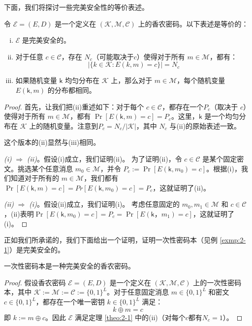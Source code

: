 下面，我们将探讨一些完美安全性的等价表述。

\begin{theorem}\label{theo:2-1}
令 $\mathcal{E}=(E,D)$ 是一个定义在 $(\mathcal{K},\mathcal{M},\mathcal{C})$ 上的香农密码。以下表述是等价的：
\begin{enumerate}[(i)]
	\item $\mathcal{E}$ 是完美安全的。
	\item 对于任意 $c\in\mathcal{C}$，存在 $N_c$（可能取决于$c$）使得对于所有 $m\in\mathcal{M}$，都有：
	$$
    |\{k\in\mathcal{K}:E(k,m)=c\}| = N_c
    $$
    \item 如果随机变量 $\mathsf{k}$ 均匀分布在 $\mathcal{K}$ 上，那么对于 $m\in\mathcal{M}$，每个随机变量 $E(\mathsf{k},m)$ 的分布都相同。
\end{enumerate}
\end{theorem}

\begin{proof}
首先，让我们把(ii)重述如下：对于每个 $c\in\mathcal{C}$，都存在一个$P_c$（取决于 $c$） 使得对于所有 $m\in\mathcal{M}$，都有 $\Pr[E(\mathsf{k},m)=c]=P_c$。这里，$\mathsf{k}$ 是一个均匀分布在 $\mathcal{K}$ 上的随机变量。注意到$P_c={N_c}/{|\mathcal{K}|}$，其中 $N_c$ 与(ii)的原始表述一致。

这个版本的(ii)显然与(iii)相同。

\vspace{5pt}

\emph{(i)} $\Longrightarrow$ \emph{(ii)}。假设(i)成立，我们证明(ii)。
为了证明(ii)，令 $c\in\mathcal{C}$ 是某个固定密文。挑选某个任意消息 $m_0\in\mathcal{M}$，并令 $P_c:=\Pr[E(\mathsf{k},m_0)=c]$。根据(i)，我们知道对于所有的 $m\in\mathcal{M}$，我们都有 $\Pr[E(\mathsf{k},m)=c]=Pr[E(\mathsf{k},m_0)=c]=P_c$，这就证明了(ii)。

\vspace{5pt}

\emph{(ii)} $\Longrightarrow$ \emph{(i)}。假设(ii)成立，我们证明(i)。
考虑任意固定的 $m_0,m_1\in\mathcal{M}$ 和 $c\in\mathcal{C}$，(ii)表明$\Pr[E(\mathsf{k},m_0)=c]=P_c=\Pr[E(\mathsf{k}，m_1)=c]$，这就证明了(i)。
\end{proof}

正如我们所承诺的，我们下面给出一个证明，证明一次性密码本（见例 \ref{exmp:2-1}）是完美安全的。

\begin{theorem}
一次性密码本是一种完美安全的香农密码。
\end{theorem}

\begin{proof}
假设香农密码 $\mathcal{E}=(E,D)$ 是一个定义在 $(\mathcal{K},\mathcal{M},\mathcal{C})$ 上的一次性密码本，其中 $\mathcal{K}:=\mathcal{M}:=\mathcal{C}:=\{0,1\}^L$。对于任意固定消息 $m\in\{0,1\}^L$ 和密文 $c\in\{0,1\}^L$，都存在一个唯一密钥 $k\in\{0,1\}^L$ 满足：
$$
k\oplus m =c
$$
即 $k:=m\oplus c$。因此 $\mathcal{E}$ 满足定理 \ref{theo:2-1} 中的(ii)（对每个$c$都有$N_c=1$）。
\end{proof}

